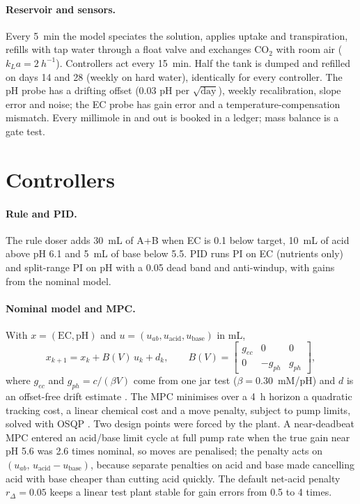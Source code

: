 \documentclass[11pt]{article}
\begin{document}
\paragraph{Reservoir and sensors.} Every \SI{5}{min} the model speciates the solution, applies uptake and transpiration, refills with tap water through a float valve and exchanges CO$_2$ with room air ($k_La = \SI{2}{h^{-1}}$). Controllers act every \SI{15}{min}. Half the tank is dumped and refilled on days 14 and 28 (weekly on hard water), identically for every controller. The pH probe has a drifting offset (\num{0.03} pH per $\sqrt{\text{day}}$), weekly recalibration, slope error and noise; the EC probe has gain error and a temperature-compensation mismatch. Every millimole in and out is booked in a ledger; mass balance is a gate test.

\section{Controllers}\label{sec:ctrl}

\paragraph{Rule and PID.} The rule doser adds \SI{30}{mL} of A+B when EC is \num{0.1} below target, \SI{10}{mL} of acid above pH 6.1 and \SI{5}{mL} of base below 5.5. PID runs PI on EC (nutrients only) and split-range PI on pH with a 0.05 dead band and anti-windup, with gains from the nominal model.

\paragraph{Nominal model and MPC.} With $x = (\text{EC}, \text{pH})$ and $u = (u_{ab}, u_\text{acid}, u_\text{base})$ in mL,
\begin{equation}
x_{k+1} = x_k + B(V)\,u_k + d_k,\qquad B(V) = \begin{bmatrix} g_{ec} & 0 & 0\\ 0 & -g_{ph} & g_{ph}\end{bmatrix},
\end{equation}
where $g_{ec}$ and $g_{ph} = c/(\beta V)$ come from one jar test ($\beta = 0.30$~mM/pH) and $d$ is an offset-free drift estimate \citep{pannocchia2003offsetfree}. The MPC minimises over a \SI{4}{h} horizon a quadratic tracking cost, a linear chemical cost and a move penalty, subject to pump limits, solved with OSQP \citep{stellato2020osqp}. Two design points were forced by the plant. A near-deadbeat MPC entered an acid/base limit cycle at full pump rate when the true gain near pH 5.6 was 2.6 times nominal, so moves are penalised; the penalty acts on $(u_{ab},\,u_\text{acid} - u_\text{base})$, because separate penalties on acid and base made cancelling acid with base cheaper than cutting acid quickly. The default net-acid penalty $r_\Delta = 0.05$ keeps a linear test plant stable for gain errors from 0.5 to 4 times.
\end{document}
